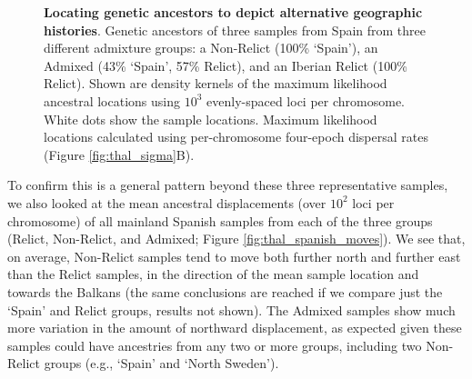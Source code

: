 \documentclass[12pt]{article}
\begin{document}
\begin{figure}[!htb]
\begin{center}

\end{center}

\caption{
\textbf{Locating genetic ancestors to depict alternative geographic histories}.
Genetic ancestors of three samples from Spain from three different admixture groups: a Non-Relict (100\% `Spain'), an Admixed (43\% `Spain', 57\% Relict), and an Iberian Relict (100\% Relict).
Shown are density kernels of the maximum likelihood ancestral locations using $10^3$ evenly-spaced loci per chromosome.
White dots show the sample locations.
Maximum likelihood locations calculated using per-chromosome four-epoch dispersal rates (Figure \ref{fig:thal_sigma}B).
}

\label{fig:thal_ancestries}
\end{figure}

To confirm this is a general pattern beyond these three representative samples, we also looked at the mean ancestral displacements (over $10^2$ loci per chromosome) of all mainland Spanish samples from each of the three groups (Relict, Non-Relict, and Admixed; Figure \ref{fig:thal_spanish_moves}).
We see that, on average, Non-Relict samples tend to move both further north and further east than the Relict samples, in the direction of the mean sample location and towards the Balkans (the same conclusions are reached if we compare just the `Spain' and Relict groups, results not shown).
The Admixed  samples show much more variation in the amount of northward displacement, as expected given these samples could have ancestries from any two or more groups, including two Non-Relict groups (e.g., `Spain' and `North Sweden').
\end{document}
